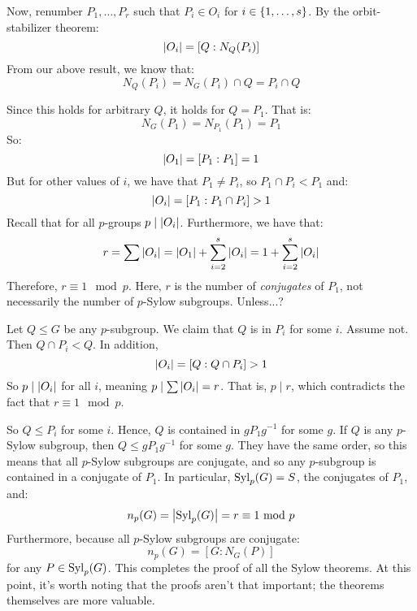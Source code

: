 Now, renumber $ P_{1}, \dots, P_{r} $ such that $ P_{i} \in O_{i} $ for
$ i \in \left\{{1, \dots, s}\right\} $. By the orbit-stabilizer theorem:
\begin{equation*}
    \abs{O_{i}} = [Q:N_{Q}(P_{i})]
\end{equation*}
From our above result, we know that:
\begin{equation*}
    N_{Q}(P_{i}) = N_{G}(P_{i}) \cap Q = P_{i} \cap Q
\end{equation*}

Since this holds for arbitrary $ Q $, it holds for $ Q = P_{1} $. That is:
\begin{equation*}
    N_{G}(P_{1}) = N_{P_{1}}(P_{1}) = P_{1}
\end{equation*}
So:
\begin{equation*}
    \abs{O_{1}} = [P_{1}:P_{1}] = 1
\end{equation*}
But for other values of $ i $, we have that $ P_{1} \neq P_{i} $, so $ P_{1} \cap P_{i} < P_{1} $
and:
\begin{equation*}
    \abs{O_{i}} = [P_{1}:P_{1}\cap P_{i}] > 1
\end{equation*}
Recall that for all $ p $-groups $ p \mid \abs{O_{i}} $. Furthermore, we have that:
\begin{equation*}
    r = \sum \abs{O_{i}} = \abs{O_{1}} + \sum_{i=2}^{s}\abs{O_{i}} = 1 + \sum_{i=2}^{s} \abs{O_{i}}
\end{equation*}
Therefore, $ r \equiv 1 \mod p $. Here, $ r $ is the number of \textit{conjugates} of $ P_{1} $,
not necessarily the number of $ p $-Sylow subgroups. Unless...? \npgh

Let $ Q \leq G $ be any $ p $-subgroup. We claim that $ Q $ is in $ P_{i} $ for some $ i $. \vsp
%
Assume not. Then $ Q \cap P_{i} < Q $. In addition,
\begin{equation*}
    \abs{O_{i}} = [Q:Q\cap P_{i}] > 1
\end{equation*}
So $ p \mid \abs{O_{i}} $ for all $ i $, meaning $ p \mid \sum \abs{O_{i}} = r $.
That is, $ p \mid r $, which contradicts the fact that $ r \equiv 1 \mod p $. \npgh

So $ Q \leq P_{i} $ for some $ i $. Hence, $ Q $ is contained in $ gP_{1}g^{-1} $ for some $ g $.
If $ Q $ is any $ p $-Sylow subgroup, then $ Q \leq gP_{1}g^{-1} $ for some $ g $.
They have the same order, so this means that all $ p $-Sylow subgroups are conjugate, and so any
$ p $-subgroup is contained in a conjugate of $ P_{1} $. \vsp
%
In particular, $ \operatorname{Syl}_{p}(G) = S $, the conjugates of $ P_{1} $, and:
\begin{equation*}
    n_{p}(G) = \abs{\operatorname{Syl}_{p}(G)} = r \equiv 1 \ \mathrm{mod}\ p
\end{equation*}
Furthermore, because all $ p $-Sylow subgroups are conjugate:
\begin{equation*}
    n_{p}(G) = [G:N_{G}(P)]
\end{equation*}
for any $ P \in \operatorname{Syl}_{p}(G) $. \vsp
%
This completes the proof of all the Sylow theorems.
At this point, it's worth noting that the proofs aren't that important; the theorems themselves
are more valuable.


